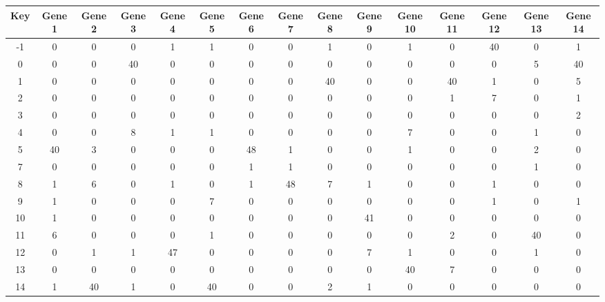 \begin{tabular}{|c|c|c|c|c|c|c|c|c|c|c|c|c|c|c|}
\hline
Key & Gene 1 & Gene 2 & Gene 3 & Gene 4 & Gene 5 & Gene 6 & Gene 7 & Gene 8 & Gene 9 & Gene 10 & Gene 11 & Gene 12 & Gene 13 & Gene 14 \\
\hline
-1 & 0 & 0 & 0 & 1 & 1 & 0 & 0 & 1 & 0 & 1 & 0 & 40 & 0 & 1 \\
0 & 0 & 0 & 40 & 0 & 0 & 0 & 0 & 0 & 0 & 0 & 0 & 0 & 5 & 40 \\
1 & 0 & 0 & 0 & 0 & 0 & 0 & 0 & 40 & 0 & 0 & 40 & 1 & 0 & 5 \\
2 & 0 & 0 & 0 & 0 & 0 & 0 & 0 & 0 & 0 & 0 & 1 & 7 & 0 & 1 \\
3 & 0 & 0 & 0 & 0 & 0 & 0 & 0 & 0 & 0 & 0 & 0 & 0 & 0 & 2 \\
4 & 0 & 0 & 8 & 1 & 1 & 0 & 0 & 0 & 0 & 7 & 0 & 0 & 1 & 0 \\
5 & 40 & 3 & 0 & 0 & 0 & 48 & 1 & 0 & 0 & 1 & 0 & 0 & 2 & 0 \\
7 & 0 & 0 & 0 & 0 & 0 & 1 & 1 & 0 & 0 & 0 & 0 & 0 & 1 & 0 \\
8 & 1 & 6 & 0 & 1 & 0 & 1 & 48 & 7 & 1 & 0 & 0 & 1 & 0 & 0 \\
9 & 1 & 0 & 0 & 0 & 7 & 0 & 0 & 0 & 0 & 0 & 0 & 1 & 0 & 1 \\
10 & 1 & 0 & 0 & 0 & 0 & 0 & 0 & 0 & 41 & 0 & 0 & 0 & 0 & 0 \\
11 & 6 & 0 & 0 & 0 & 1 & 0 & 0 & 0 & 0 & 0 & 2 & 0 & 40 & 0 \\
12 & 0 & 1 & 1 & 47 & 0 & 0 & 0 & 0 & 7 & 1 & 0 & 0 & 1 & 0 \\
13 & 0 & 0 & 0 & 0 & 0 & 0 & 0 & 0 & 0 & 40 & 7 & 0 & 0 & 0 \\
14 & 1 & 40 & 1 & 0 & 40 & 0 & 0 & 2 & 1 & 0 & 0 & 0 & 0 & 0 \\
\hline
\end{tabular}